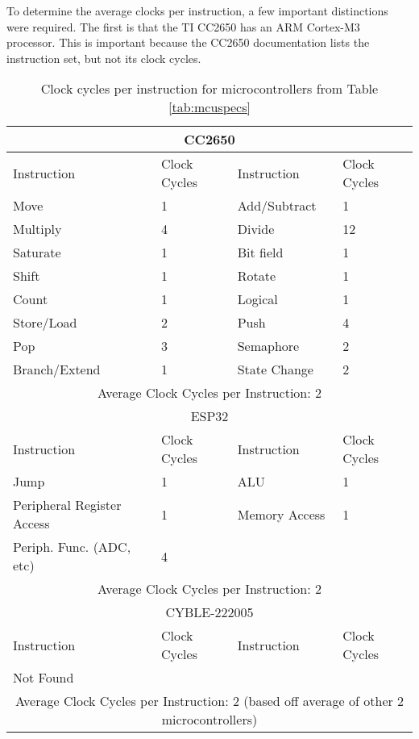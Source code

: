 \documentclass[12pt, titlepage]{article}
\begin{document}
To determine the average clocks per instruction, a few important distinctions were required. The first is that the TI CC2650 has an ARM Cortex-M3 processor. This is important because the CC2650 documentation lists the instruction set, but not its clock cycles.

\begin{table}[H]
    \centering
    \begin{tabular}{|p{5cm} p{1.5cm} p{5cm} p{1.5cm} | }
        \hline
        \multicolumn{4}{|c|}{CC2650\cite{cortex-m3}} \\
        \hline
        Instruction & Clock Cycles & Instruction  & Clock Cycles \\
        \hline
        Move        & 1            & Add/Subtract & 1 \\
        Multiply    & 4            & Divide       & 12 \\
        Saturate    & 1            & Bit field    & 1 \\ 
        Shift       & 1            & Rotate       & 1 \\
        Count       & 1            & Logical      & 1 \\
        Store/Load  & 2            & Push         & 4 \\
        Pop         & 3            & Semaphore    & 2 \\
        Branch/Extend & 1          & State Change & 2 \\
        \hline
        \multicolumn{4}{|c|}{Average Clock Cycles per Instruction: 2} \\
        \hline
        \hline
        \multicolumn{4}{|c|}{ESP32\cite{esp-idf}} \\
        \hline
        Instruction & Clock Cycles & Instruction & Clock Cycles \\
        \hline
        Jump        & 1            & ALU         & 1 \\
        Peripheral Register Access & 1 & Memory Access & 1 \\
        Periph. Func. (ADC, etc) & 4 & & \\
        \hline
        \multicolumn{4}{|c|}{Average Clock Cycles per Instruction: 2} \\
        \hline
        \hline
        \multicolumn{4}{|c|}{CYBLE-222005} \\
        \hline
        Instruction & Clock Cycles & Instruction & Clock Cycles \\
        \hline
        Not Found & & & \\
        \hline
        \multicolumn{4}{|c|}{Average Clock Cycles per Instruction: 2 (based off average of other 2 microcontrollers)} \\
        \hline
    \end{tabular}
    \caption{Clock cycles per instruction for microcontrollers from Table \ref{tab:mcuspecs}}
    \label{tab:instrset}
\end{table}
\end{document}

